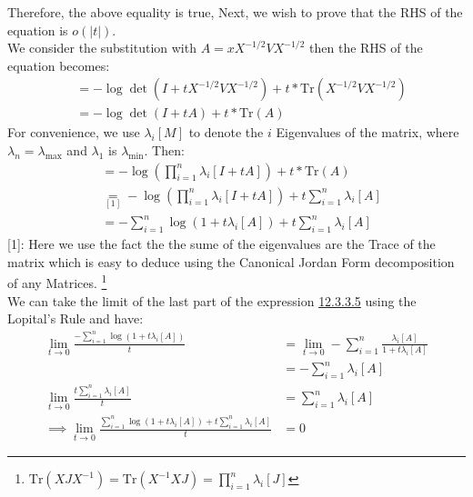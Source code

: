 \documentclass[]{article}
\begin{document}
        Therefore, the above equality is true, Next, we wish to prove that the RHS of the equation is $o(|t|)$. 
        \\
        We consider the substitution with $A = x X^{-1/2}VX^{-1/2}$ then the RHS of the equation becomes: 
        \begin{align*}\tag{12.3.3.4}\label{eqn:12.3.3.4}
            &=-\log\det(I + t X^{-1/2}V X^{-1/2}) + t * \text{Tr}(X^{-1/2}V X^{-1/2})
            \\
            &=  
            -\log\det(I + tA) + t* \text{Tr}(A)
        \end{align*}
        For convenience, we use $\lambda_i[M]$ to denote the $i$ Eigenvalues of the matrix, where $\lambda_n = \lambda_{\max}$ and $\lambda_1$ is $\lambda_{\min}$. Then: 
        \begin{align*}\tag{12.3.3.5}\label{eqn:12.3.3.5}
            &= -\log\left(
                \prod_{i = 1}^{n}\lambda_i[I + tA]
            \right) + t* \text{Tr}(A)
            \\
            &
            \underset{[1]}{=}
            -\log\left(
                \prod_{i = 1}^{n}\lambda_i[I + tA]
            \right) + t \sum_{i = 1}^{n}\lambda_i[A]
            \\
            &= - \sum_{i = 1}^{n}\log \left(
                1 + t\lambda_i[A]
            \right) + t \sum_{i = 1}^{n} \lambda_i[A]
        \end{align*}
        [1]: Here we use the fact the the sume of the eigenvalues are the Trace of the matrix which is easy to deduce using the Canonical Jordan Form decomposition of any Matrices. \footnote[1]{$\text{Tr}(XJX^{-1}) = \text{Tr}(X^{-1}XJ) = \prod_{i= 1}^{n} \lambda_i[J]$  }
        \\
        We can take the limit of the last part of the expression \hyperref[eqn:12.3.3.5]{12.3.3.5} using the Lopital's Rule and have: 
        \begin{align*}\tag{12.3.3.6}\label{eqn:12.3.3.6}
            \lim_{t \rightarrow 0} 
            \frac{
                -\sum_{i = 1}^{n}\log(1 + t \lambda_i[A])
            }{t} &= 
            \lim_{t \rightarrow 0} - \sum_{i = 1}^{n}
                \frac{\lambda_i[A]}{1 + t \lambda_i[A]}
            \\
            &= -\sum_{i = 1}^{n}\lambda_i[A]
            \\
            \lim_{t\rightarrow 0} \frac{t \sum_{i = 1}^{n} \lambda_i[A]}{t} &= 
            \sum_{i = 1}^{n} \lambda_i[A] 
            \\
            \implies 
            \lim_{t\rightarrow 0}
            \frac{\sum_{i = 1}^{n}\log \left(
                1 + t\lambda_i[A]
            \right) + t \sum_{i = 1}^{n} \lambda_i[A]}{t}
            &= 0
        \end{align*}
\end{document}
